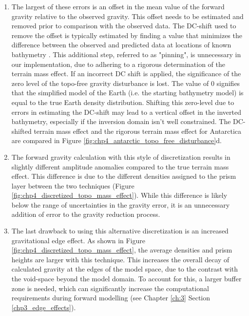 \begin{enumerate}
    \item The largest of these errors is an offset in the mean value of the forward gravity relative to the observed gravity. This offset needs to be estimated and removed prior to comparison with the observed data. The DC-shift used to remove the offset is typically estimated by finding a value that minimizes the difference between the observed and predicted data at locations of known bathymetry \citep[e.g.,][]{boghosianresolving2015, cochrandetailed2020, eisermannbathymetry2020, constantinoseafloor2020, mutosubglacial2013, millanbathymetry2017}. This additional step, referred to as "pinning", is unnecessary in our implementation, due to adhering to a rigorous determination of the terrain mass effect. If an incorrect DC shift is applied, the significance of the zero level of the topo-free gravity disturbance is lost. The value of 0 signifies that the simplified model of the Earth (i.e. the starting bathymetry model) is equal to the true Earth density distribution. Shifting this zero-level due to errors in estimating the DC-shift may lead to a vertical offset in the inverted bathymetry, especially if the inversion domain isn't well constrained. The DC-shifted terrain mass effect and the rigorous terrain mass effect for Antarctica are compared in Figure \ref{fig:chp4_antarctic_topo_free_disturbance}d.
    
    \item The forward gravity calculation with this style of discretization results in slightly different amplitude anomalies compared to the true terrain mass effect. This difference is due to the different densities assigned to the prism layer between the two techniques (Figure \ref{fig:chp4_discretized_topo_mass_effect}). While this difference is likely below the range of uncertainties in the gravity error, it is an unnecessary addition of error to the gravity reduction process.
    
    \item The last drawback to using this alternative discretization is an increased gravitational edge effect. As shown in Figure \ref{fig:chp4_discretized_topo_mass_effect}, the average densities and prism heights are larger with this technique. This increases the overall decay of calculated gravity at the edges of the model space, due to the contrast with the void-space beyond the model domain. To account for this, a larger buffer zone is needed, which can significantly increase the computational requirements during forward modelling (see Chapter \ref{ch:3} Section \ref{chp3_edge_effects}).
\end{enumerate}

